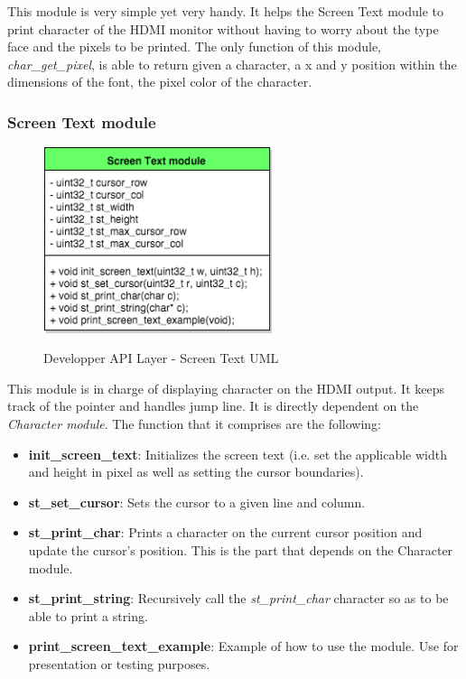 This module is very simple yet very handy. It helps the Screen Text module to print character of the HDMI monitor without having to worry about the type face and the pixels to be printed. The only function of this module, \textit{char\_get\_pixel}, is able to return given a character, a x and y position within the dimensions of the font, the pixel color of the character.




\subsubsection{Screen Text module}

\begin{figure}[H]
\begin{center}
\includegraphics[width=0.6\textwidth]{includes/figures/chapter5_developper_api_layer_st_UML.png}  \\
\caption{Developper API Layer - Screen Text UML}
\end{center}
\label{fig:chapter5_developper_api_layer_st_UML}
\end{figure}

This module is in charge of displaying character on the HDMI output. It keeps track of the pointer and handles jump line. It is directly dependent on the \textit{Character module}. The function that it comprises are the following:
\begin{itemize}
	\item \textbf{init\_screen\_text}: Initializes the screen text (i.e. set the applicable width and height in pixel as well as setting the cursor boundaries).
	\item \textbf{st\_set\_cursor}: Sets the cursor to a given line and column.
	\item \textbf{st\_print\_char}: Prints a character on the current cursor position and update the cursor's position. This is the part that depends on the Character module.
	\item \textbf{st\_print\_string}: Recursively call the \textit{st\_print\_char} character so as to be able to print a string.
	\item \textbf{print\_screen\_text\_example}: Example of how to use the module. Use for presentation or testing purposes.
\end{itemize}




